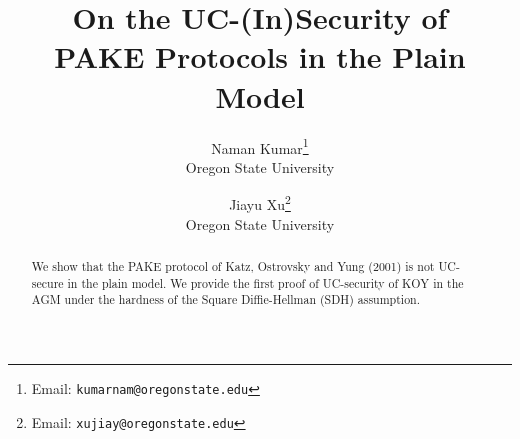 \documentclass[11pt,letterpaper]{article}
\title{\LARGE{\textbf{On the UC-(In)Security of\\PAKE Protocols in the Plain Model}}}
\author{{Naman Kumar}\footnote{Email: \texttt{kumarnam@oregonstate.edu}} \\Oregon State University\\ \and {Jiayu Xu}\footnote{Email: \texttt{xujiay@oregonstate.edu}}\\ Oregon State University}
\begin{document}
	\maketitle
	
	\begin{abstract}
		We show that the PAKE protocol of Katz, Ostrovsky and Yung (2001) is not UC-secure in the plain model. We provide the first proof of UC-security of KOY in the AGM under the hardness of the Square Diffie-Hellman (SDH) assumption.
	\end{abstract}
	
	
	
	
	
	
	
	\newpage
	
	
	
	\newpage
	\appendix
	
	
	
	
\end{document}
